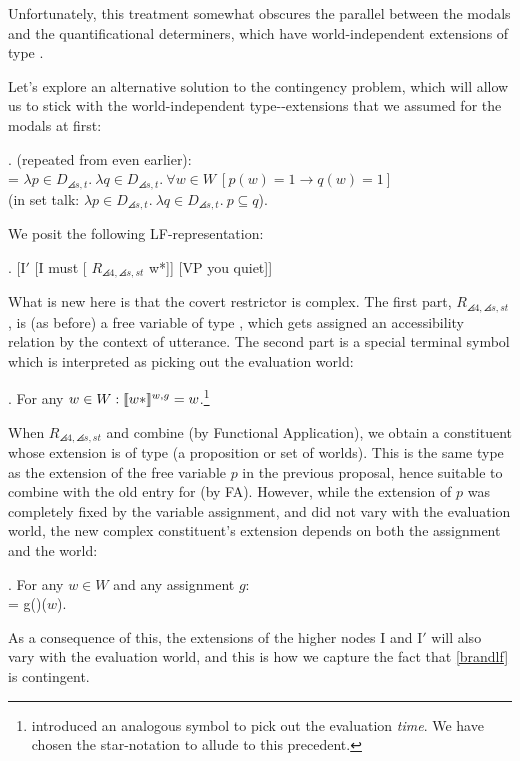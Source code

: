 Unfortunately, this treatment somewhat obscures the parallel between the modals and the quantificational determiners, which have world-independent extensions of type .

Let's explore an alternative solution to the contingency problem, which will allow us to stick with the world-independent type--extensions that we assumed for the modals at first:

\ex. (repeated from even earlier): \\
 = $\lambda p\in D_{\angles{s,t}}.\ \lambda q\in D_{\angles{s,t}}.\ \forall w\in W\ [p(w)=1 \rightarrow q(w)=1]$\\
\null\hfill(in set talk: $\lambda p \in D_{\angles{s,t}}.\ \lambda q \in D_{\angles{s,t}}.\ p \ensuremath{\subseteq} q$).

We posit the following LF-representation:

\exi. \label{brandlf} [I$'$ [I must [ $R_{\angles{4,\angles{s,st}}}$ w*]] [VP you quiet]]

What is new here is that the covert restrictor is complex. The first part, $R_{\angles{4,\angles{s,st}}}$, is (as before) a free variable of type , which gets assigned an accessibility relation by the context of utterance. The second part is a special terminal symbol which is interpreted as picking out the evaluation world:

\ex. For any $w\in W: \llbracket w* \rrbracket^{w,g} = w$.\footnote{\citet{dowty:1982:time-adverbs} introduced an analogous symbol to pick out the evaluation \emph{time}. We have chosen the star-notation to allude to this precedent.}

When $R_{\angles{4,\angles{s,st}}}$ and  combine (by Functional Application), we obtain a constituent whose extension is of type  (a proposition or set of worlds). This is the same type as the extension of the free variable $p$ in the previous proposal, hence suitable to combine with the old entry for  (by FA). However, while the extension of $p$ was completely fixed by the variable assignment, and did not vary with the evaluation world, the new complex constituent's extension depends on both the assignment and the world:

\ex. For any $w\in W$ and any assignment $g$: \\
 = g()($w$).

As a consequence of this, the extensions of the higher nodes I and I$'$ will also vary with the evaluation world, and this is how we capture the fact that \ref{brandlf} is contingent.

